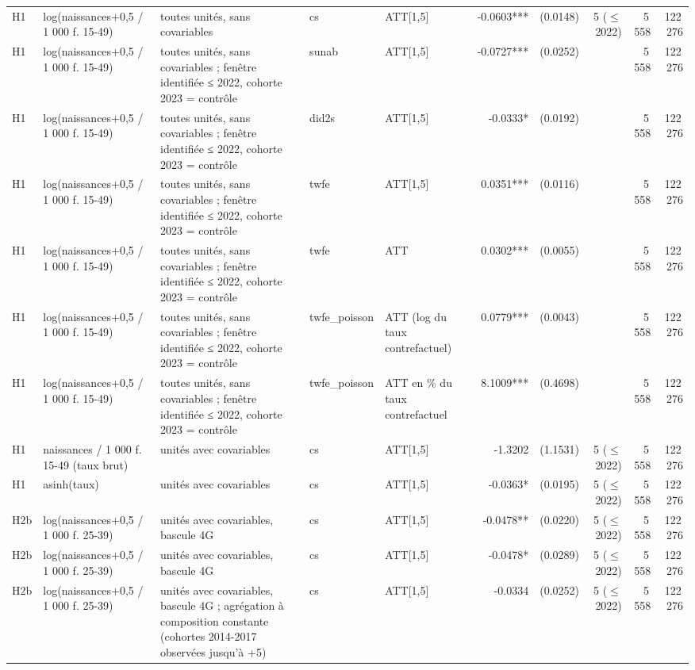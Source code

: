 \begin{table}
\begin{threeparttable}
\begin{tabular}{lp{3.8cm}p{6.5cm}lp{3.5cm}rrrrr}
H1 & log(naissances+0,5 / 1 000 f. 15-49) & toutes unités, sans covariables & cs & ATT[1,5] & -0.0603*** & (0.0148) & 5 ($\leq$ 2022) & 5\,558 & 122\,276 \\
H1 & log(naissances+0,5 / 1 000 f. 15-49) & toutes unités, sans covariables ; fenêtre identifiée ≤ 2022, cohorte 2023 = contrôle & sunab & ATT[1,5] & -0.0727*** & (0.0252) &  & 5\,558 & 122\,276 \\
H1 & log(naissances+0,5 / 1 000 f. 15-49) & toutes unités, sans covariables ; fenêtre identifiée ≤ 2022, cohorte 2023 = contrôle & did2s & ATT[1,5] & -0.0333* & (0.0192) &  & 5\,558 & 122\,276 \\
H1 & log(naissances+0,5 / 1 000 f. 15-49) & toutes unités, sans covariables ; fenêtre identifiée ≤ 2022, cohorte 2023 = contrôle & twfe & ATT[1,5] & 0.0351*** & (0.0116) &  & 5\,558 & 122\,276 \\
H1 & log(naissances+0,5 / 1 000 f. 15-49) & toutes unités, sans covariables ; fenêtre identifiée ≤ 2022, cohorte 2023 = contrôle & twfe & ATT & 0.0302*** & (0.0055) &  & 5\,558 & 122\,276 \\
H1 & log(naissances+0,5 / 1 000 f. 15-49) & toutes unités, sans covariables ; fenêtre identifiée ≤ 2022, cohorte 2023 = contrôle & twfe\_poisson & ATT (log du taux contrefactuel) & 0.0779*** & (0.0043) &  & 5\,558 & 122\,276 \\
H1 & log(naissances+0,5 / 1 000 f. 15-49) & toutes unités, sans covariables ; fenêtre identifiée ≤ 2022, cohorte 2023 = contrôle & twfe\_poisson & ATT en \% du taux contrefactuel & 8.1009*** & (0.4698) &  & 5\,558 & 122\,276 \\
H1 & naissances / 1 000 f. 15-49 (taux brut) & unités avec covariables & cs & ATT[1,5] & -1.3202 & (1.1531) & 5 ($\leq$ 2022) & 5\,558 & 122\,276 \\
H1 & asinh(taux) & unités avec covariables & cs & ATT[1,5] & -0.0363* & (0.0195) & 5 ($\leq$ 2022) & 5\,558 & 122\,276 \\
H2b & log(naissances+0,5 / 1 000 f. 25-39) & unités avec covariables, bascule 4G & cs & ATT[1,5] & -0.0478** & (0.0220) & 5 ($\leq$ 2022) & 5\,558 & 122\,276 \\
H2b & log(naissances+0,5 / 1 000 f. 25-39) & unités avec covariables, bascule 4G & cs & ATT[1,5] & -0.0478* & (0.0289) & 5 ($\leq$ 2022) & 5\,558 & 122\,276 \\
H2b & log(naissances+0,5 / 1 000 f. 25-39) & unités avec covariables, bascule 4G ; agrégation à composition constante (cohortes 2014-2017 observées jusqu'à +5) & cs & ATT[1,5] & -0.0334 & (0.0252) & 5 ($\leq$ 2022) & 5\,558 & 122\,276 \\

\end{tabular}
\end{threeparttable}
\end{table}
